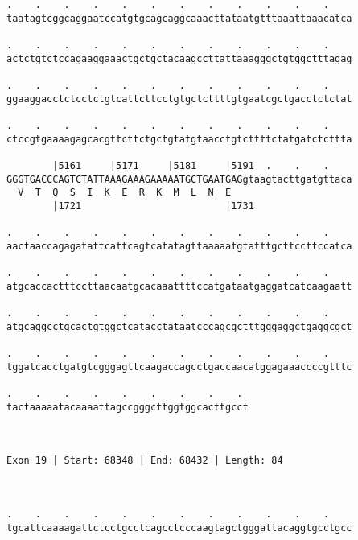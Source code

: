 \documentclass{article}
\begin{document}
\begin{Verbatim}
.    .    .    .    .    .    .    .    .    .    .    .    
taatagtcggcaggaatccatgtgcagcaggcaaacttataatgtttaaattaaacatca
                                                            
.    .    .    .    .    .    .    .    .    .    .    .    
actctgtctccagaaggaaactgctgctacaagccttattaaagggctgtggctttagag
                                                            
.    .    .    .    .    .    .    .    .    .    .    .    
ggaaggacctctcctctgtcattcttcctgtgctcttttgtgaatcgctgacctctctat
                                                            
.    .    .    .    .    .    .    .    .    .    .    .    
ctccgtgaaaagagcacgttcttctgctgtatgtaacctgtcttttctatgatctcttta
                                                            
        |5161     |5171     |5181     |5191  .    .    .    
GGGTGACCCAGTCTATTAAAGAAAGAAAAATGCTGAATGAGgtaagtacttgatgttaca
  V  T  Q  S  I  K  E  R  K  M  L  N  E                     
        |1721                         |1731                 
  
.    .    .    .    .    .    .    .    .    .    .    .    
aactaaccagagatattcattcagtcatatagttaaaaatgtatttgcttccttccatca
                                                            
.    .    .    .    .    .    .    .    .    .    .    .    
atgcaccactttccttaacaatgcacaaattttccatgataatgaggatcatcaagaatt
                                                            
.    .    .    .    .    .    .    .    .    .    .    .    
atgcaggcctgcactgtggctcatacctataatcccagcgctttgggaggctgaggcgct
                                                            
.    .    .    .    .    .    .    .    .    .    .    .    
tggatcacctgatgtcgggagttcaagaccagcctgaccaacatggagaaaccccgtttc
                                                            
.    .    .    .    .    .    .    .    . 
tactaaaaatacaaaattagccgggcttggtggcacttgcct
                                          
                                          
 
Exon 19 | Start: 68348 | End: 68432 | Length: 84



.    .    .    .    .    .    .    .    .    .    .    .    
tgcattcaaaagattctcctgcctcagcctcccaagtagctgggattacaggtgcctgcc
                                                            

\end{Verbatim}
\end{document}

